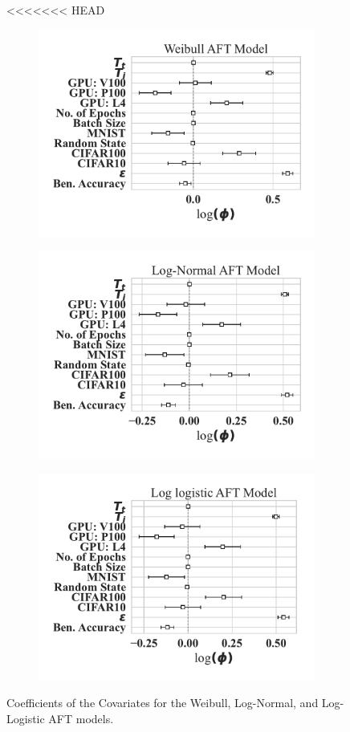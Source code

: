 \documentclass[sn-mathphys-num]{sn-jnl}%
\begin{document}
\begin{figure}[tph!]
    \centering
<<<<<<< HEAD
    \captionsetup[subfigure]{skip=0pt} %
    \begin{subfigure}{\textwidth}
        \centering
        \includegraphics[width=.57\textwidth]{plots/combined/weibull_aft.pdf}
    \end{subfigure}
    \begin{subfigure}{\textwidth}
        \centering
        \includegraphics[width=.57\textwidth]{plots/combined/log_normal_aft.pdf}
    \end{subfigure}
    \begin{subfigure}{\textwidth}
        \centering
        \includegraphics[width=.57\textwidth]{plots/combined/log_logistic_aft.pdf}
    \end{subfigure}
    \caption{Coefficients of the Covariates for the Weibull, Log-Normal, and Log-Logistic AFT models.
}
\end{figure}
\end{document}
